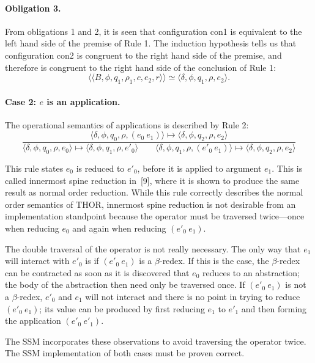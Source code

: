 \paragraph{Obligation 3.} From obligations 1 and 2, it is seen that
configuration con1 is equivalent to the left hand side of the premise of Rule
1. The induction hypothesis tells us that configuration con2 is congruent to
the right hand side of the premise, and therefore is congruent to the right hand
side of the conclusion of Rule 1:
\[
\langle\!\langle B,\phi,q_1,\rho_1,c,e_2,r\rangle\!\rangle
\simeq
\langle \delta,\phi,q_1,\rho,e_2\rangle.
\]

\paragraph{Case 2: \(e\) is an application.}
The operational semantics of applications is described by Rule 2:
\[
\frac{
  \langle \delta,\phi,q_0,\rho,(e_0\ e_1)\rangle
  \longmapsto
  \langle \delta,\phi,q_2,\rho,e_2\rangle
}{
  \langle \delta,\phi,q_0,\rho,e_0\rangle
  \longmapsto
  \langle \delta,\phi,q_1,\rho,e'_0\rangle
  \qquad
  \langle \delta,\phi,q_1,\rho,(e'_0\ e_1)\rangle
  \longmapsto
  \langle \delta,\phi,q_2,\rho,e_2\rangle
}
\]

This rule states \(e_0\) is reduced to \(e'_0\), before it is applied to
argument \(e_1\). This is called innermost spine reduction in~[9], where it is
shown to produce the same result as normal order reduction. While this rule
correctly describes the normal order semantics of THOR, innermost spine
reduction is not desirable from an implementation standpoint because the
operator must be traversed twice---once when reducing \(e_0\) and again when
reducing \((e'_0\ e_1)\).

The double traversal of the operator is not really necessary. The only way that
\(e_1\) will interact with \(e'_0\) is if \((e'_0\ e_1)\) is a
\(\beta\)-redex. If this is the case, the \(\beta\)-redex can be contracted as
soon as it is discovered that \(e_0\) reduces to an abstraction; the body of the
abstraction then need only be traversed once. If \((e'_0\ e_1)\) is not a
\(\beta\)-redex, \(e'_0\) and \(e_1\) will not interact and there is no point
in trying to reduce \((e'_0\ e_1)\); its value can be produced by first
reducing \(e_1\) to \(e'_1\) and then forming the application
\((e'_0\ e'_1)\).

The SSM incorporates these observations to avoid traversing the operator twice.
The SSM implementation of both cases must be proven correct.

